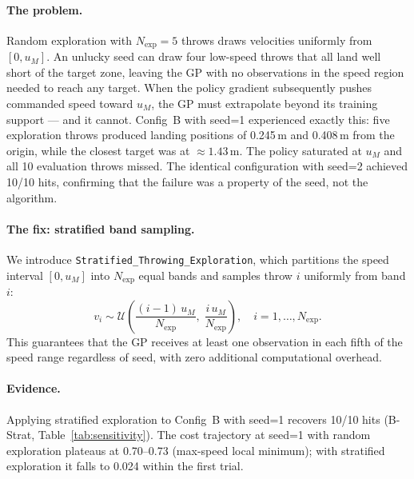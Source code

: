\paragraph{The problem.}
Random exploration with $N_{\mathrm{exp}} = 5$ throws draws velocities uniformly from
$[0, u_M]$.
An unlucky seed can draw four low-speed throws that all land well short of the target
zone, leaving the GP with no observations in the speed region needed to reach any target.
When the policy gradient subsequently pushes commanded speed toward $u_M$, the GP must
extrapolate beyond its training support — and it cannot.
Config~B with seed=1 experienced exactly this: five exploration throws produced landing
positions of 0.245\,m and 0.408\,m from the origin, while the closest target was at
$\approx 1.43$\,m.
The policy saturated at $u_M$ and all 10 evaluation throws missed.
The identical configuration with seed=2 achieved 10/10 hits, confirming that the
failure was a property of the seed, not the algorithm.

\paragraph{The fix: stratified band sampling.}
We introduce \texttt{Stratified\_Throwing\_Exploration}, which partitions the speed
interval $[0, u_M]$ into $N_{\mathrm{exp}}$ equal bands and samples throw $i$ uniformly
from band $i$:
\begin{equation}
  v_i \sim \mathcal{U}\!\left(
    \frac{(i-1)\,u_M}{N_{\mathrm{exp}}},\;
    \frac{i\,u_M}{N_{\mathrm{exp}}}
  \right), \quad i = 1, \ldots, N_{\mathrm{exp}}.
  \label{eq:stratified}
\end{equation}
This guarantees that the GP receives at least one observation in each fifth of the speed
range regardless of seed, with zero additional computational overhead.

\paragraph{Evidence.}
Applying stratified exploration to Config~B with seed=1 recovers 10/10 hits
(B-Strat, Table~\ref{tab:sensitivity}).
The cost trajectory at seed=1 with random exploration plateaus at 0.70--0.73 (max-speed
local minimum); with stratified exploration it falls to 0.024 within the first trial.
